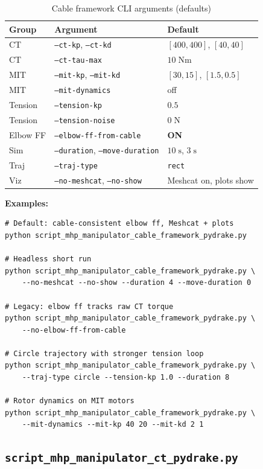 \documentclass[11pt,a4paper]{article}
\begin{document}
\begin{table}[H]
\centering
\caption{Cable framework CLI arguments (defaults)}
\small
\begin{tabular}{@{}lll@{}}
\toprule
\textbf{Group} & \textbf{Argument} & \textbf{Default} \\
\midrule
CT & \texttt{--ct-kp}, \texttt{--ct-kd} & $[400,400]$, $[40,40]$ \\
CT & \texttt{--ct-tau-max} & $10\;\mathrm{Nm}$ \\
MIT & \texttt{--mit-kp}, \texttt{--mit-kd} & $[30,15]$, $[1.5,0.5]$ \\
MIT & \texttt{--mit-dynamics} & off \\
Tension & \texttt{--tension-kp} & $0.5$ \\
Tension & \texttt{--tension-noise} & $0\;\mathrm{N}$ \\
Elbow FF & \texttt{--elbow-ff-from-cable} & \textbf{ON} \\
Sim & \texttt{--duration}, \texttt{--move-duration} & $10\;\mathrm{s}$, $3\;\mathrm{s}$ \\
Traj & \texttt{--traj-type} & \texttt{rect} \\
Viz & \texttt{--no-meshcat}, \texttt{--no-show} & Meshcat on, plots show \\
\bottomrule
\end{tabular}
\end{table}

\textbf{Examples:}
\begin{lstlisting}[style=python, caption={Cable framework --- common invocations}]
# Default: cable-consistent elbow ff, Meshcat + plots
python script_mhp_manipulator_cable_framework_pydrake.py

# Headless short run
python script_mhp_manipulator_cable_framework_pydrake.py \
    --no-meshcat --no-show --duration 4 --move-duration 0

# Legacy: elbow ff tracks raw CT torque
python script_mhp_manipulator_cable_framework_pydrake.py \
    --no-elbow-ff-from-cable

# Circle trajectory with stronger tension loop
python script_mhp_manipulator_cable_framework_pydrake.py \
    --traj-type circle --tension-kp 1.0 --duration 8

# Rotor dynamics on MIT motors
python script_mhp_manipulator_cable_framework_pydrake.py \
    --mit-dynamics --mit-kp 40 20 --mit-kd 2 1
\end{lstlisting}

\subsection{\texttt{script\_mhp\_manipulator\_ct\_pydrake.py}}
\end{document}
